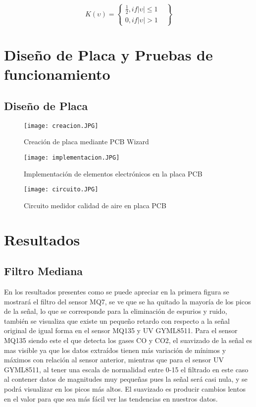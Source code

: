 \documentclass[10pt,a4paper]{article}
\begin{document}
\begin{equation}
K(\upsilon )=\begin{Bmatrix}
\frac{1}{2}, if \left | \upsilon  \right | \leq 1 & \\ 
0, if \left | \upsilon  \right | > 1 & 
\end{Bmatrix}
\end{equation}


\section{Diseño de Placa y Pruebas de funcionamiento}
\subsection{Diseño de Placa}


\begin{figure}[H]
\centering
 \texttt{[image: creacion.JPG]} 
\caption{Creación de placa mediante PCB Wizard}
\end{figure}

\begin{figure}[H]
\centering
\texttt{[image: implementacion.JPG]} 
\caption{Implementación de elementos electrónicos en la placa PCB} 
\end{figure}

\begin{figure}[H]
\centering
\texttt{[image: circuito.JPG]}
 \caption{Circuito medidor calidad de aire en placa PCB} 
\end{figure} 

\section{Resultados}
\subsection{Filtro Mediana}
En los resultados presentes como se puede apreciar en la primera figura se mostrará el filtro del sensor MQ7, se ve que se ha quitado la mayoría de los picos de la señal, lo que se corresponde para la eliminación de espurios y ruido, también se visualiza que existe un pequeño retardo con respecto a la señal original de igual forma en el sensor MQ135 y UV GYML8511.
Para el sensor MQ135 siendo este el que detecta los gases CO y CO2, el suavizado de la señal es mas visible ya que los datos extraídos tienen más variación de mínimos y máximos con relación al sensor anterior, mientras que para el sensor UV GYML8511, al tener una escala de normalidad entre 0-15 el filtrado en este caso al contener datos de magnitudes muy pequeñas pues la señal será casi nula, y se podrá visualizar en los picos más altos. El suavizado es producir cambios lentos en el valor para que sea más fácil ver las tendencias en nuestros datos.\\
\end{document}
